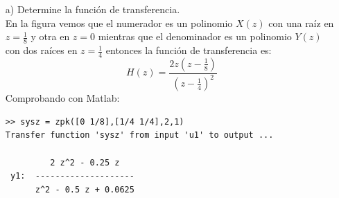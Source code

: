 \documentclass[a4paper,12pt]{article}
\begin{document}
\begin{itemize}
    \item[a)] Determine la función de transferencia. \\
        En la figura vemos que el numerador es un polinomio $X(z)$ con una raíz en $z = \frac{1}{8}$ y otra en $z = 0$ mientras que el denominador es un polinomio $Y(z)$ con dos raíces en $z = \frac{1}{4}$ entonces la función de transferencia es:
        \[ H(z) = \frac{2z\left(z - \frac{1}{8}\right)}{\left(z - \frac{1}{4}\right)^2} \]
        Comprobando con Matlab:
        \begin{lstlisting}
>> sysz = zpk([0 1/8],[1/4 1/4],2,1)
Transfer function 'sysz' from input 'u1' to output ...

         2 z^2 - 0.25 z
 y1:  --------------------
      z^2 - 0.5 z + 0.0625


\end{lstlisting}
\end{itemize}
\end{document}
